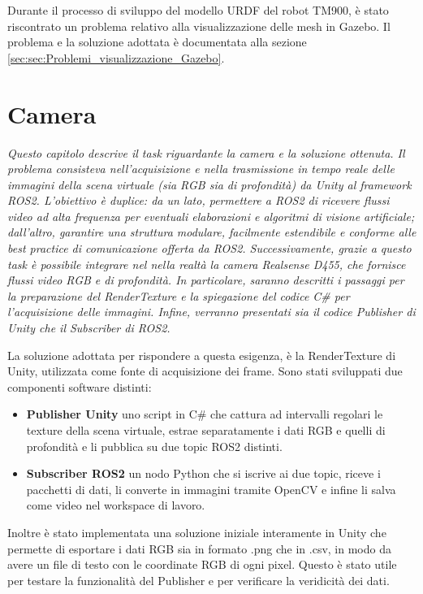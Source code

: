 \documentclass[11pt]{report}
\begin{document}
Durante il processo di sviluppo del modello URDF del robot TM900, è stato riscontrato un problema relativo alla visualizzazione delle mesh in Gazebo. Il problema e la soluzione adottata è documentata alla sezione \ref{sec:sec:Problemi_visualizzazione_Gazebo}.

\section{Camera}
\textit{Questo capitolo descrive il task riguardante la camera e la soluzione ottenuta. Il problema consisteva nell’acquisizione e nella trasmissione in tempo reale delle immagini della scena virtuale (sia RGB sia di profondità) da Unity al framework ROS2. L’obiettivo è duplice: da un lato, permettere a ROS2 di ricevere flussi video ad alta frequenza per eventuali elaborazioni e algoritmi di visione artificiale; dall’altro, garantire una struttura modulare, facilmente estendibile e conforme alle best practice di comunicazione offerta da ROS2. Successivamente, grazie a questo task è possibile integrare nel nella realtà la camera Realsense D455, che fornisce flussi video RGB e di profondità. In particolare, saranno descritti i passaggi per la preparazione del RenderTexture e la spiegazione del codice C\# per l’acquisizione delle immagini. Infine, verranno presentati sia il codice Publisher di Unity che il Subscriber di ROS2.}

La soluzione adottata per rispondere a questa esigenza, è la RenderTexture di Unity, utilizzata come fonte di acquisizione dei frame. Sono stati sviluppati due componenti software distinti:
\begin{itemize}
    \item \textbf{Publisher Unity} uno script in C\# che cattura ad intervalli regolari le texture della scena virtuale, estrae separatamente i dati RGB e quelli di profondità e li pubblica su due topic ROS2 distinti.

    \item \textbf{Subscriber ROS2} un nodo Python che si iscrive ai due topic, riceve i pacchetti di dati, li converte in immagini tramite OpenCV e infine li salva come video nel workspace di lavoro.
\end{itemize}

Inoltre è stato implementata una soluzione iniziale interamente in Unity che permette di esportare i dati RGB sia in formato .png che in .csv, in modo da avere un file di testo con le coordinate RGB di ogni pixel. Questo è stato utile per testare la funzionalità del Publisher e per verificare la veridicità dei dati.
\end{document}
